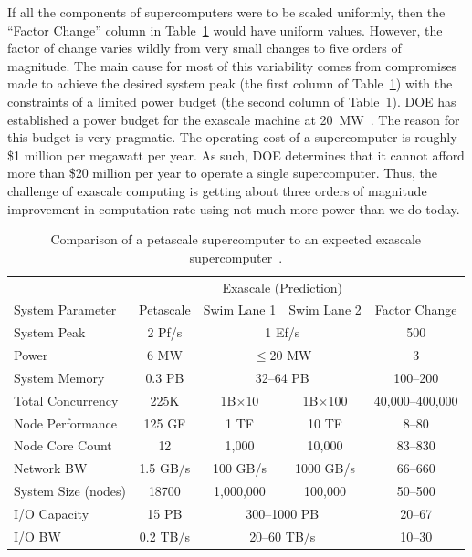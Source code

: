 \documentclass[conference]{IEEEtran}
\newcommand*{\lcite}[1]{~\cite{#1}}
\begin{document}
If all the components of supercomputers were to be scaled uniformly, then
the ``Factor Change'' column in Table~\ref{table:PetascaleVsExascale} would
have uniform values.  However, the factor of change varies wildly from very
small changes to five orders of magnitude.  The main cause for most of this
variability comes from compromises made to achieve the desired system peak
(the first column of Table~\ref{table:PetascaleVsExascale}) with the
constraints of a limited power budget (the second column of
Table~\ref{table:PetascaleVsExascale}).  DOE has established a power budget
for the exascale machine at 20~MW\lcite{ExascaleArchitecturesReport}.  The
reason for this budget is very pragmatic.  The operating cost of a
supercomputer is roughly \$1 million per megawatt per year.  As such, DOE
determines that it cannot afford more than \$20 million per year to operate
a single supercomputer.  Thus, the challenge of exascale computing is
getting about three orders of magnitude improvement in computation rate
using not much more power than we do today.

\begin{table}[htdp]
  \centering
  \caption{Comparison of a petascale supercomputer to an expected exascale
    supercomputer\lcite{ScientificDiscoveryExascale2011}.}
  \label{table:PetascaleVsExascale}
  \begin{tabular}{@{}lcccc@{}}
    \toprule
    & & \multicolumn{2}{c}{Exascale (Prediction)} & \\
    System Parameter & Petascale & Swim Lane 1 & Swim Lane 2 & Factor Change \\
    \midrule
    System Peak & 2 Pf/s & \multicolumn{2}{c}{1 Ef/s} & 500 \\
    Power & 6 MW & \multicolumn{2}{c}{$\le$20 MW} & 3\\
    System Memory & 0.3 PB & \multicolumn{2}{c}{32--64 PB} & 100--200 \\ %
    Total Concurrency & 225K & 1B$\times$10 & 1B$\times$100 & 40,000--400,000 \\
    Node Performance & 125 GF & 1 TF & 10 TF & 8--80\\
    Node Core Count & 12 & 1,000 & 10,000 & 83--830 \\
    Network BW & 1.5 GB/s & 100 GB/s & 1000 GB/s & 66--660 \\
    System Size (nodes) & 18700 & 1,000,000 & 100,000 & 50--500 \\
    I/O Capacity & 15 PB & \multicolumn{2}{c}{300--1000 PB} & 20--67\\
    I/O BW & 0.2 TB/s & \multicolumn{2}{c}{20--60 TB/s} & 10--30 \\
    \bottomrule
  \end{tabular}
\end{table}
\end{document}
